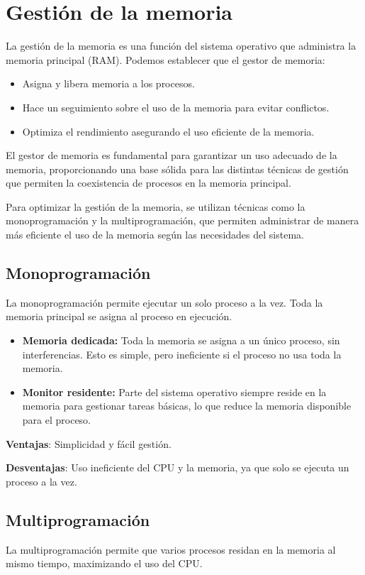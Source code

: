 \section{Gestión de la memoria}
La gestión de la memoria es una función del sistema operativo que administra la memoria principal (RAM). Podemos establecer que el gestor de memoria:

\begin{itemize}
	\item Asigna y libera memoria a los procesos.
	\item Hace un seguimiento sobre el uso de la memoria para evitar conflictos.
	\item Optimiza el rendimiento asegurando el uso eficiente de la memoria.
\end{itemize}

El gestor de memoria es fundamental para garantizar un uso adecuado de la memoria, proporcionando una base sólida para las distintas técnicas de gestión que permiten la coexistencia de procesos en la memoria principal.

Para optimizar la gestión de la memoria, se utilizan técnicas como la monoprogramación y la multiprogramación, que permiten administrar de manera más eficiente el uso de la memoria según las necesidades del sistema.

\subsection{Monoprogramación}
La monoprogramación permite ejecutar un solo proceso a la vez. Toda la memoria principal se asigna al proceso en ejecución.

\begin{itemize}
	\item \textbf{Memoria dedicada: }Toda la memoria se asigna a un único proceso, sin interferencias. Esto es simple, pero ineficiente si el proceso no usa toda la memoria.
	\item \textbf{Monitor residente: }Parte del sistema operativo siempre reside en la memoria para gestionar tareas básicas, lo que reduce la memoria disponible para el proceso.
\end{itemize}

\textbf{Ventajas}: Simplicidad y fácil gestión.

\textbf{Desventajas}: Uso ineficiente del CPU y la memoria, ya que solo se ejecuta un proceso a la vez.

\subsection{Multiprogramación}
 La multiprogramación permite que varios procesos residan en la memoria al mismo tiempo, maximizando el uso del CPU.
 
